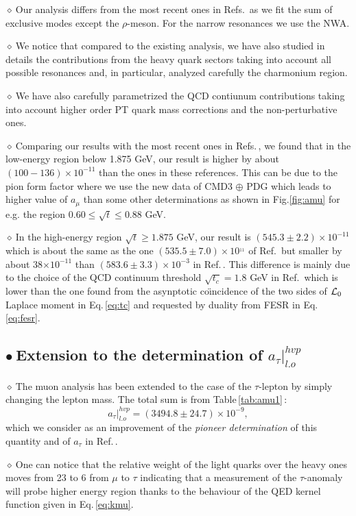 \documentclass[review]{elsarticle}
\def\beq{\begin{equation}}
\def\eeq{\end{equation}}
\def\b{$\bullet~$}
\def\d{$\diamond~$}
\begin{document}
\d Our analysis differs from the most recent ones in Refs.\,\cite{NOMURA,DAVIER2} as we fit the sum of exclusive modes except the $\rho$-meson.  For the narrow resonances we use the NWA.

\d We notice that compared to the existing analysis, we have also studied in details the contributions from the heavy quark sectors taking into account all possible resonances and, in particular, analyzed carefully the charmonium region. 

\d We have also carefully parametrized the QCD contiunum contributions taking into account higher order PT quark mass corrections and the non-perturbative ones. 

\d Comparing our results with the most recent ones in Refs.\,\cite{DAVIER2,NOMURA}, we found that in the low-energy region below 1.875 GeV, our result is higher by about $(100-136)\times 10^{-11}$ than the ones in these references. This can be due to the pion form factor where we use the new data of CMD3 $\oplus$ PDG which leads to higher value of $a_\mu$ than some other determinations as shown in Fig.\ref{fig:amu} for e.g. the region $0.60\leq \sqrt{t}\leq 0.88$ GeV.

\d In the high-energy region $\sqrt{t}\geq 1.875$ GeV, our result is $(545.3\pm 2.2)\times 10^{-11}$ which is  about the same as  the one $(535.5\pm 7.0)\times 10^{_11}$ of Ref.\,\cite{NOMURA}  but smaller by about 38$\times 10^{-11}$ than $(583.6\pm 3.3)\times 10^{-3}$ in Ref.\,\cite{DAVIER2}. This difference is mainly due to  the choice of the QCD continuum threshold $\sqrt{t_c}= 1.8$ GeV in Ref.\,\cite{DAVIER2}  which is lower than the one found from the asynptotic co\"\i ncidence of the two sides of ${\cal L}_0$ Laplace moment  in Eq.\,\ref{eq:tc} and requested by duality from FESR   in Eq. \ref{eq:fesr}. 

\subsection*{\b Extension to the determination of  $a_\tau\vert^{hvp}_{l.o}$} 
\d The muon analysis has been extended to the case of the $\tau$-lepton by simply changing the lepton mass. The total sum is from Table\,\ref{tab:amu1}\,:
\beq
a_\tau\vert^{hvp}_{l.o}=(3494.8\pm 24.7)\times 10^{-9},
\eeq
which we consider as an improvement of the {\it pioneer determination} of this quantity and of $a_\tau$ in Ref.\,\cite{SN78}. 

\d One can notice that the relative weight of the light quarks over the heavy ones moves from 23 to 6 from $\mu$ to $\tau$ indicating that a measurement of the $\tau$-anomaly will probe higher energy region thanks to the behaviour of the QED kernel function  given in Eq.\,\ref{eq:kmu}. 
\end{document}
